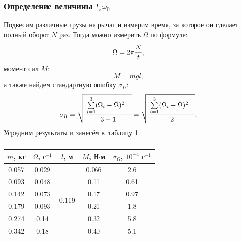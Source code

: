 \documentclass[a4paper,12pt]{article}
\theoremstyle{plain} %
\theoremstyle{definition} %
\theoremstyle{remark} %
\begin{document}
\subsubsection{Определение величины $I_z \omega_0$}
Подвесим различные грузы на рычаг и измерим время, за которое он сделает полный оборот $N$ раз. Тогда  можно измерить $\Omega$ по формуле:
$$\Omega = 2 \pi \cfrac{N}{t}\,,$$
момент сил $M$:
$$M=mgl,$$
а также найдем стандартную ошибку $\sigma_{\Omega}$:
$$\sigma_{\Omega}=\sqrt{\cfrac{\sum \limits_{i=1}^3 (\Omega_i - \bar{\Omega})^2 \quad}{3-1}}=\sqrt{\cfrac{\sum \limits_{i=1}^3 (\Omega_i - \bar{\Omega})^2 \quad}{2}}.$$
Усредним результаты и занесём в~таблицу \ref{tab1}.
\begin{table}[h!]
\centering
\caption{ }
\label{tab1}
\setlength{\extrarowheight}{1mm}
\begin{tabular}{|c|c|c|c|c|}
\hline
$m$, кг & $\Omega$, $\text{с}^{-1}$ & $l$, м                 & $M$, Н$\cdot$м & $\sigma_{\Omega}$, $10^{-4}$ $\text{с}^{-1}$ \\ \hline
0.057   & 0.029              & \multirow{6}{*}{0.119} & 0.066           & 2.6                                            \\ \cline{1-2} \cline{4-5} 
0.093   & 0.048              &                        & 0.11            & 0.61                                           \\ \cline{1-2} \cline{4-5} 
0.142   & 0.073              &                        & 0.17            & 0.97                                           \\ \cline{1-2} \cline{4-5} 
0.179   & 0.093              &                        & 0.21            & 1.8                                            \\ \cline{1-2} \cline{4-5} 
0.274   & 0.14               &                        & 0.32            & 5.8                                            \\ \cline{1-2} \cline{4-5} 
0.342   & 0.18               &                        & 0.40            & 5.1                                            \\ \hline
\end{tabular}
\end{table}
\setlength{\extrarowheight}{0mm}
\end{document}
